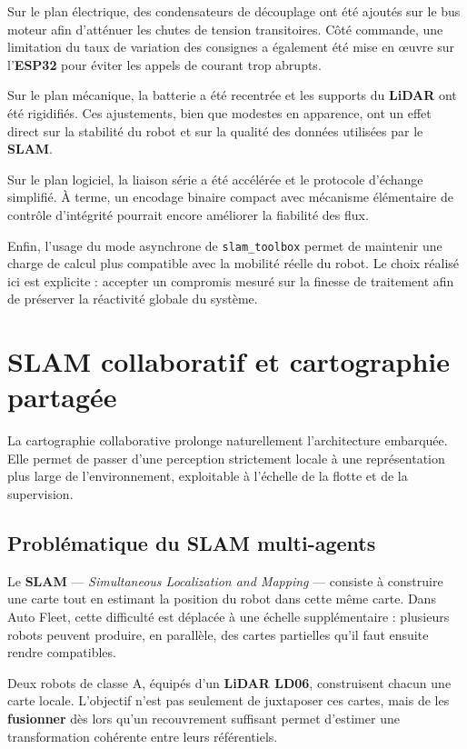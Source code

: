 \documentclass[11pt,a4paper]{report}
\newcommand{\kw}[1]{\textbf{#1}}
\begin{document}
Sur le plan électrique, des condensateurs de découplage ont été ajoutés sur le bus moteur afin d’atténuer les chutes de tension transitoires. Côté commande, une limitation du taux de variation des consignes a également été mise en œuvre sur l’\kw{ESP32} pour éviter les appels de courant trop abrupts.

Sur le plan mécanique, la batterie a été recentrée et les supports du \kw{LiDAR} ont été rigidifiés. Ces ajustements, bien que modestes en apparence, ont un effet direct sur la stabilité du robot et sur la qualité des données utilisées par le \kw{SLAM}.

Sur le plan logiciel, la liaison série a été accélérée et le protocole d’échange simplifié. À terme, un encodage binaire compact avec mécanisme élémentaire de contrôle d’intégrité pourrait encore améliorer la fiabilité des flux.

Enfin, l’usage du mode asynchrone de \texttt{slam\_toolbox} permet de maintenir une charge de calcul plus compatible avec la mobilité réelle du robot. Le choix réalisé ici est explicite : accepter un compromis mesuré sur la finesse de traitement afin de préserver la réactivité globale du système.

\section{SLAM collaboratif et cartographie partagée}

La cartographie collaborative prolonge naturellement l’architecture embarquée. Elle permet de passer d’une perception strictement locale à une représentation plus large de l’environnement, exploitable à l’échelle de la flotte et de la supervision.

\subsection{Problématique du SLAM multi-agents}

Le \kw{SLAM} --- \textit{Simultaneous Localization and Mapping} --- consiste à construire une carte tout en estimant la position du robot dans cette même carte. Dans Auto Fleet, cette difficulté est déplacée à une échelle supplémentaire : plusieurs robots peuvent produire, en parallèle, des cartes partielles qu’il faut ensuite rendre compatibles.

Deux robots de classe A, équipés d’un \kw{LiDAR LD06}, construisent chacun une carte locale. L’objectif n’est pas seulement de juxtaposer ces cartes, mais de les \kw{fusionner} dès lors qu’un recouvrement suffisant permet d’estimer une transformation cohérente entre leurs référentiels.
\end{document}

